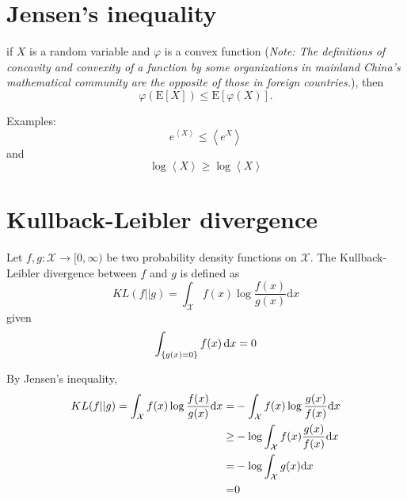 \begin{appendices}
\chapter{Jensen's inequality\label{chapter:Appendix:JI}}
if $X$ is a random variable and $ \varphi$ is a convex function (\textit{Note: The definitions of concavity and convexity of a function by some organizations in mainland China's mathematical community are the opposite of those in foreign countries.}), then
\begin{equation}
     \varphi(\mathrm{E}[X]) \leq \mathrm{E}[\varphi(X)] .
\end{equation}

Examples:
\begin{equation}
	e^{\left<X\right>}\leq \left<e^X\right>
\end{equation}
and
\begin{equation}
	\log {\left<X\right>}\geq \log \left<X\right>
\end{equation}


\chapter{Kullback-Leibler divergence\label{chapter:Appendix:KLD}}
Let $f, g: \mathcal{X} \rightarrow[0, \infty)$ be two probability density functions on $\mathcal{X}$. The Kullback-Leibler divergence between $f$ and $g$ is defined as
\begin{equation}
     K L(f||g)=\int_{\mathcal{X}} f(x)  \log \frac{f(x)}{g(x)} \mathrm{d} x
\end{equation}
given
\begin{equation}
	\int_{\left\{g(x)=0\right\}} f(x)\mathop{}\!\mathrm{d} x=0
\end{equation}

By Jensen's inequality,
\begin{align}
	K L(f||g)=\int_{\mathcal{X}} f(x)  \log \frac{f(x)}{g(x)} \mathrm{d} x=&-\int_{\mathcal{X}} f(x)  \log \frac{g(x)}{f(x)} \mathrm{d} x \notag\\
	                                                                                                               \geq& -\log \int_{\mathcal{X}} f(x)  \frac{g(x)}{f(x)} \mathrm{d} x \notag\\
	                                                                                                               =& -\log \int_{\mathcal{X}} g(x) \mathrm{d} x \notag\\
	                                                                                                               =& 0
\end{align}


\end{appendices}

